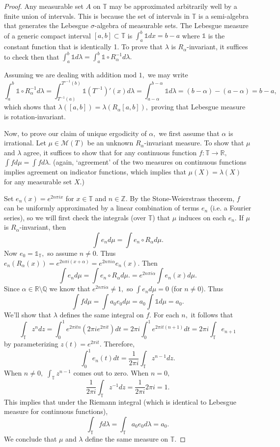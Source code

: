 \documentclass[12pt, letterpaper, oneside]{book}
\newcommand{\ga}{\ensuremath{\alpha}}
\newcommand{\gl}{\ensuremath{\lambda}}
\newcommand{\gm}{\ensuremath{\mu}}
\newcommand{\Q}{\mathbb{Q}}
\newcommand{\R}{\mathbb{R}}
\newcommand{\Z}{\mathbb{Z}}
\newcommand{\T}{\mathbb{T}}
\theoremstyle{plain}
\theoremstyle{definition}
\theoremstyle{remark}
\begin{document}
\begin{proof}
Any measurable set $A$ on $\T$ may be approximated arbitrarily well by a finite union of intervals. This is because the set of intervals in $\T$ is a semi-algebra that generates the Lebesgue $\sigma$-algebra of measurable sets. The Lebesgue measure of a generic compact interval $[a,b] \subset \T$ is $\int_a^b \mathds{1}dx = b - a$ where $\mathds{1}$ is the constant function that is identically 1. To prove that $\gl$ is $R_\ga$-invariant, it suffices to check then that $\int_a^b \mathds{1} d\gl = \int_a^b \mathds{1} \circ R^{-1}_\ga d \gl.$ 

Assuming we are dealing with addition $\mbox{mod 1},$ we may write
\[
\int_a^b \mathds{1} \circ R^{-1}_\ga d \gl = \int_{T^{-1}(a)}^{T'^{-1}(b)} \mathds{1} (T^{-1})'(x) d \gl = \int_{a -\ga}^{b - \ga} \mathds{1} d \gl = (b - \ga) - (a - \ga) = b-a,
\]
which shows that $\gl([a,b]) = \gl(R_\ga[a,b]),$ proving that Lebesgue measure is rotation-invariant. 


Now, to prove our claim of unique ergodicity of $\ga,$ we first assume that $\ga$ is irrational. Let $\mu \in \mathcal{M}(T)$ be an unknown $R_\ga$-invariant measure. To show that $\mu$ and $\gl$ agree, it suffices to show that for any continuous function $f:\T \to \R,$ $\int f d \mu = \int f d \gl.$ (again, `agreement' of the two measures on continuous functions implies agreement on indicator functions, which implies that $\mu(X) = \gl(X)$ for any measurable set $X.$) 

Set $e_n(x) = e^{2n\pi ix}$ for $x \in \T$ and $n \in \Z.$ By the Stone-Weierstrass theorem, $f$ can be uniformly approximated by a linear combination of terms $e_n$ (i.e. a Fourier series), so we will first check the integrals (over $\T$) that $\gm$ induces on each $e_n.$  If $\mu$ is $R_\ga$-invariant, then 
\[
\int e_n d\mu = \int e_n \circ R_\ga d\mu.
\]  
Now $e_0 = \mathds{1}_{\T},$ so assume $n \neq 0.$ Thus $e_n(R_\ga(x)) = e^{2n\pi i (x + \ga)} = e^{2n\pi i \ga}e_n(x).$ Then
\[
\int e_n d\mu = \int e_n \circ R_\ga d\mu. = e^{2n\pi i \ga}\int e_n(x) d\mu.
\]
Since $\ga \in \R \setminus \Q$ we know that $e^{2n\pi i \ga} \neq 1,$ so $\int e_n d \mu = 0$ (for $n \neq 0$). Thus
\[
\int f d \gm = \int a_0 e_0 d \gm = a_0 \int \mathds{1} d \gm = a_0.
\]
We'll show that $\gl$ defines the same integral on $f.$ For each $n,$ it follows that
\[
\int_{\T} z^n dz = \int_0^1 e^{2\pi i t n} (2 \pi i e^{2 \pi i t}) dt = 2 \pi i \int_0^1 e^{2 \pi i t (n+1)} dt = 2 \pi i \int_{\T} e_{n+1}
\]
by parameterizing $z(t) = e^{2\pi i t}.$ Therefore,
\[
\int_0^1 e_n(t)dt = \frac{1}{2\pi i} \int_{\T} z^{n-1} dz.
\]
When $n \neq 0,$ $\int_{\T} z^{n-1}$ comes out to zero. When $n = 0,$ 
\[
\frac{1}{2 \pi i} \int_{\T} z^{-1} dz = \frac{1}{2 \pi i} 2 \pi i = 1.
\]
This implies that under the Riemann integral (which is identical to Lebesgue measure for continuous functions),
\[
\int_{\T} f d \gl = \int_{\T} a_0 e_0 d \gl = a_0. 
\]
We conclude that $\gm$ and $\gl$ define the same measure on $\T.$


\end{proof}
\end{document}
